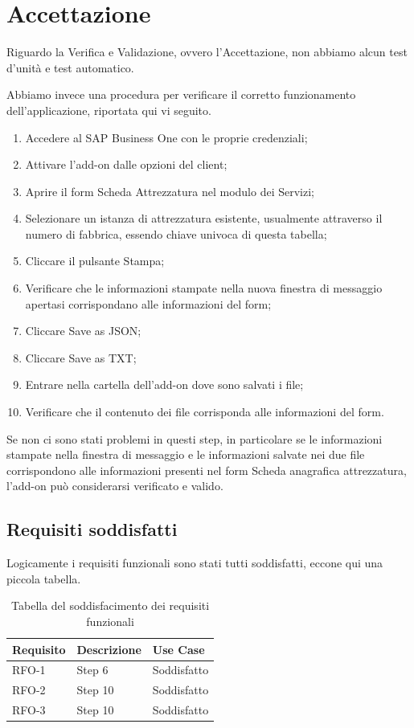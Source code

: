 \newpage

\section{Accettazione}
Riguardo la Verifica e Validazione, ovvero l'Accettazione, non abbiamo alcun test d'unità e test automatico.

Abbiamo invece una procedura per verificare il corretto funzionamento dell'applicazione, riportata qui vi seguito.

\begin{enumerate}
	\item Accedere al SAP Business One con le proprie credenziali;
	\item Attivare l'add-on dalle opzioni del client;
	\item Aprire il form Scheda Attrezzatura nel modulo dei Servizi;
	\item Selezionare un istanza di attrezzatura esistente, usualmente attraverso il numero di fabbrica, essendo chiave univoca di questa tabella;
	\item Cliccare il pulsante Stampa;
	\item Verificare che le informazioni stampate nella nuova finestra di messaggio apertasi corrispondano alle informazioni del form;
	\item Cliccare Save as JSON;
	\item Cliccare Save as TXT;
	\item Entrare nella cartella dell'add-on dove sono salvati i file;
	\item Verificare che il contenuto dei file corrisponda alle informazioni del form.
\end{enumerate}

Se non ci sono stati problemi in questi step, in particolare se le informazioni stampate nella finestra di messaggio e le informazioni salvate nei due file corrispondono alle informazioni presenti nel form Scheda anagrafica attrezzatura, l'add-on può considerarsi verificato e valido.

\subsection{Requisiti soddisfatti}
Logicamente i requisiti funzionali sono stati tutti soddisfatti, eccone qui una piccola tabella.

\begin{table}[!h]%
	\begin{tabularx}{\textwidth}{lXl}
		\hline\hline
		\textbf{Requisito} & \textbf{Descrizione} & \textbf{Use Case}\\
		\hline
		RFO-1     & Step 6 & Soddisfatto \\
		RFO-2     & Step 10 & Soddisfatto\\
		RFO-3     & Step 10 & Soddisfatto\\
		\hline
	\end{tabularx}
	\caption{Tabella del soddisfacimento dei requisiti funzionali}
	\label{tab:requisiti-funzionali-soddisfatti}
\end{table}%
